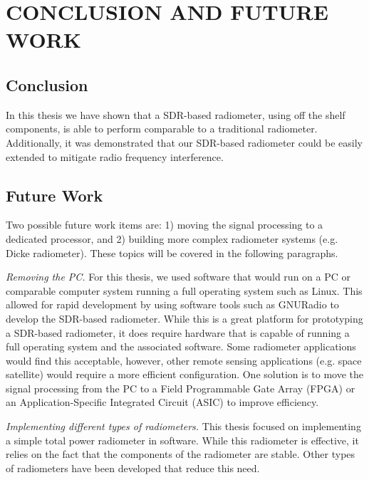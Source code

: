 
\chapter{CONCLUSION AND FUTURE WORK} \label{ch:conclusion}

\section{Conclusion}
In this thesis we have shown that a SDR-based radiometer, using off the shelf components, is able to perform comparable to a traditional radiometer.  Additionally, it was demonstrated that our SDR-based radiometer could be easily extended to mitigate radio frequency interference.   

\section{Future Work}\label{Futurework}

Two possible future work items are: 1) moving the signal processing to a dedicated processor, and 2) building more complex radiometer systems (e.g. Dicke radiometer).  These topics will be covered in the following paragraphs.   

\emph{Removing the PC.}  For this thesis, we used software that would run on a PC or comparable computer system running a full operating system such as Linux.  This allowed for rapid development by using software tools such as GNURadio to develop the SDR-based radiometer.  While this is a great platform for prototyping a SDR-based radiometer, it does require hardware that is capable of running a full operating system and the associated software.  Some radiometer applications would find this acceptable, however, other remote sensing applications (e.g. space satellite) would require a more efficient configuration.  One solution is to move the signal processing from the PC to a Field Programmable Gate Array (FPGA) or an Application-Specific Integrated Circuit (ASIC) to improve efficiency.

\emph{Implementing different types of radiometers.}  
This thesis focused on implementing a simple total power radiometer in software.  While this radiometer is effective, it relies on the fact that the components of the radiometer are stable.  Other types of radiometers have been developed that reduce this need.  

